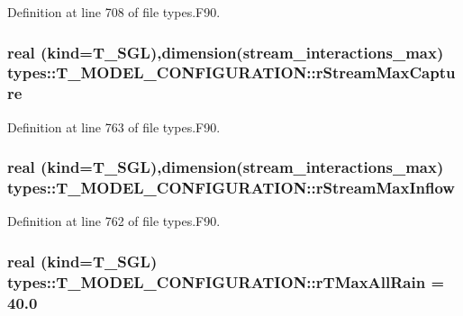 Definition at line 708 of file types.F90.

\hypertarget{typetypes_1_1_t___m_o_d_e_l___c_o_n_f_i_g_u_r_a_t_i_o_n_a0708256407027113296a232420c6f196}{
\subsubsection[{rStreamMaxCapture}]{\setlength{\rightskip}{0pt plus 5cm}real (kind={\bf T\_\-SGL}),dimension(stream\_\-interactions\_\-max) {\bf types::T\_\-MODEL\_\-CONFIGURATION::rStreamMaxCapture}}}
\label{typetypes_1_1_t___m_o_d_e_l___c_o_n_f_i_g_u_r_a_t_i_o_n_a0708256407027113296a232420c6f196}


Definition at line 763 of file types.F90.

\hypertarget{typetypes_1_1_t___m_o_d_e_l___c_o_n_f_i_g_u_r_a_t_i_o_n_afa027b1f3076f5273d9ab83b893d03ab}{
\subsubsection[{rStreamMaxInflow}]{\setlength{\rightskip}{0pt plus 5cm}real (kind={\bf T\_\-SGL}),dimension(stream\_\-interactions\_\-max) {\bf types::T\_\-MODEL\_\-CONFIGURATION::rStreamMaxInflow}}}
\label{typetypes_1_1_t___m_o_d_e_l___c_o_n_f_i_g_u_r_a_t_i_o_n_afa027b1f3076f5273d9ab83b893d03ab}


Definition at line 762 of file types.F90.

\hypertarget{typetypes_1_1_t___m_o_d_e_l___c_o_n_f_i_g_u_r_a_t_i_o_n_a1368525b4e815a98e8547ca59b47068e}{
\subsubsection[{rTMaxAllRain}]{\setlength{\rightskip}{0pt plus 5cm}real (kind={\bf T\_\-SGL}) {\bf types::T\_\-MODEL\_\-CONFIGURATION::rTMaxAllRain} = 40.0}}
\label{typetypes_1_1_t___m_o_d_e_l___c_o_n_f_i_g_u_r_a_t_i_o_n_a1368525b4e815a98e8547ca59b47068e}


